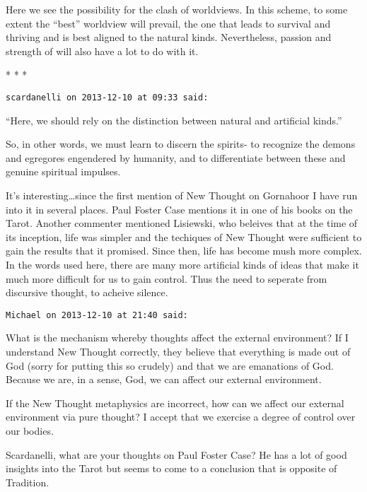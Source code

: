 Here we see the possibility for the clash of worldviews. In this scheme, to some extent the “best” worldview will prevail, the one that leads to survival and thriving and is best aligned to the natural kinds. Nevertheless, passion and strength of will also have a lot to do with it.




\begin{center}* * *\end{center}

\begin{footnotesize}\begin{sffamily}


\texttt{scardanelli on 2013-12-10 at 09:33 said:}

“Here, we should rely on the distinction between natural and artificial kinds.”

So, in other words, we must learn to discern the spirits- to recognize the demons and egregores engendered by humanity, and to differentiate between these and genuine spiritual impulses.

It's interesting…since the first mention of New Thought on Gornahoor I have run into it in several places. Paul Foster Case mentions it in one of his books on the Tarot. Another commenter mentioned Lisiewski, who beleives that at the time of its inception, life was simpler and the techiques of New Thought were sufficient to gain the results that it promised. Since then, life has become mush more complex. In the words used here, there are many more artificial kinds of ideas that make it much more difficult for us to gain control. Thus the need to seperate from discursive thought, to acheive silence.


\hfill

\texttt{Michael on 2013-12-10 at 21:40 said: }

What is the mechanism whereby thoughts affect the external environment? If I understand New Thought correctly, they believe that everything is made out of God (sorry for putting this so crudely) and that we are emanations of God. Because we are, in a sense, God, we can affect our external environment.

If the New Thought metaphysics are incorrect, how can we affect our external environment via pure thought? I accept that we exercise a degree of control over our bodies.

Scardanelli, what are your thoughts on Paul Foster Case? He has a lot of good insights into the Tarot but seems to come to a conclusion that is opposite of Tradition.



\end{sffamily}
\end{footnotesize}
